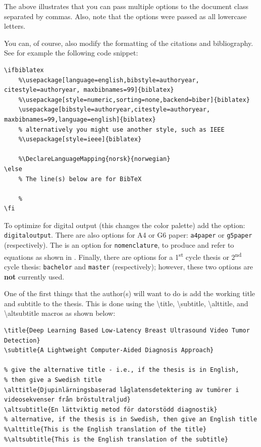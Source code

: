 \documentclass[examplethesis.tex]{subfiles}
\begin{document}
The above illustrates that you can pass multiple options to the document class separated by commas. Also, note that the options were passed as all lowercase letters.

You can, of course, also modify the formatting of the citations and bibliography. See for example the following code snippet:

\begin{lstlisting}[style=latexExampleForAuthors]
\ifbiblatex
    %\usepackage[language=english,bibstyle=authoryear, citestyle=authoryear, maxbibnames=99]{biblatex}
    %\usepackage[style=numeric,sorting=none,backend=biber]{biblatex}
    \usepackage[bibstyle=authoryear,citestyle=authoryear, maxbibnames=99,language=english]{biblatex}
    % alternatively you might use another style, such as IEEE
    %\usepackage[style=ieee]{biblatex}
    
    %\DeclareLanguageMapping{norsk}{norwegian}
\else
    % The line(s) below are for BibTeX
    
    %
\fi
\end{lstlisting}

To optimize for digital output (this changes the color palette) add the option: \texttt{digitaloutput}. There are also options for A4 or G6 paper: \texttt{a4paper} or \texttt{g5paper} (respectively). The is an option for \texttt{nomenclature}, to produce and refer to equations
\ifnomenclature
as shown in 
\fi
.  Finally, there are options for a 1\textsuperscript{st} cycle thesis or 2\textsuperscript{nd} cycle thesis: \texttt{bachelor} and \texttt{master} (respectively); however, these two options are \textbf{not} currently used.

One of the first things that the author(s) will want to do is add the working title and subtitle to the thesis. This is done using the \textbackslash title, \textbackslash subtitle, \textbackslash alttitle, and \textbackslash altsubtitle macros as shown below:
\begin{lstlisting}[style=latexExampleForAuthors]
\title{Deep Learning Based Low-Latency Breast Ultrasound Video Tumor Detection}
\subtitle{A Lightweight Computer-Aided Diagnosis Approach}

% give the alternative title - i.e., if the thesis is in English,
% then give a Swedish title
\alttitle{Djupinlärningsbaserad låglatensdetektering av tumörer i videosekvenser från bröstultraljud}
\altsubtitle{En lättviktig metod för datorstödd diagnostik}
% alternative, if the thesis is in Swedish, then give an English title
%\alttitle{This is the English translation of the title}
%\altsubtitle{This is the English translation of the subtitle}   
\end{lstlisting}
\end{document}
